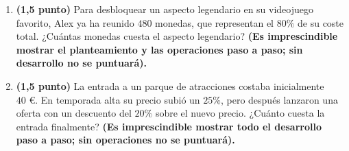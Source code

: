 \documentclass[a4paper,12pt]{extarticle}
\begin{document}
\begin{enumerate}
         \item \textbf{(1,5 punto)} Para desbloquear un aspecto legendario en su videojuego favorito, Alex ya ha reunido $480$ monedas, que representan el $80\%$ de su coste total. ¿Cuántas monedas cuesta el aspecto legendario? \textbf{(Es imprescindible mostrar el planteamiento y las operaciones paso a paso; sin desarrollo no se puntuará).}
        \item \textbf{(1,5 punto)} La entrada a un parque de atracciones costaba inicialmente $40\text{ €}$. En temporada alta su precio subió un $25\%$, pero después lanzaron una oferta con un descuento del $20\%$ sobre el nuevo precio. ¿Cuánto cuesta la entrada finalmente? \textbf{(Es imprescindible mostrar todo el desarrollo paso a paso; sin operaciones no se puntuará).}
    \end{enumerate}
\end{document}
